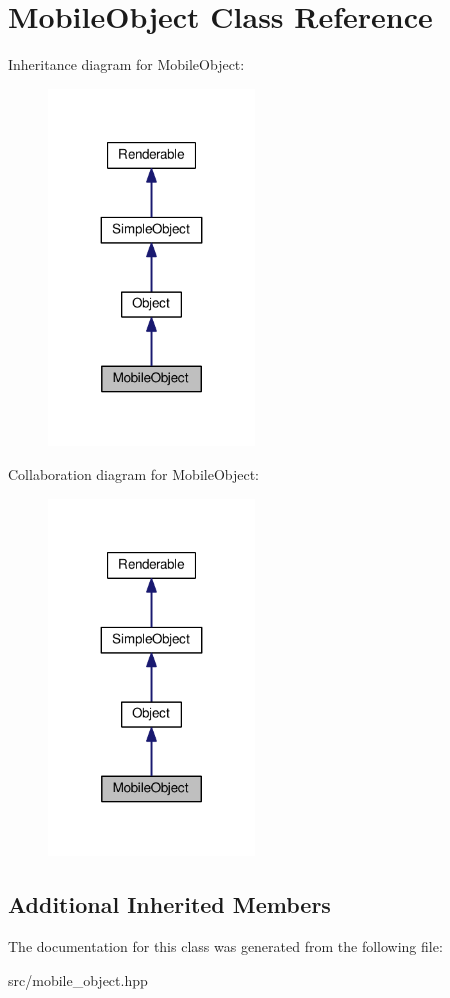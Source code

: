 \hypertarget{class_mobile_object}{}\section{Mobile\+Object Class Reference}
\label{class_mobile_object}


Inheritance diagram for Mobile\+Object\+:\nopagebreak
\begin{figure}[H]
\begin{center}
\leavevmode
\includegraphics[width=155pt]{class_mobile_object__inherit__graph}
\end{center}
\end{figure}


Collaboration diagram for Mobile\+Object\+:\nopagebreak
\begin{figure}[H]
\begin{center}
\leavevmode
\includegraphics[width=155pt]{class_mobile_object__coll__graph}
\end{center}
\end{figure}
\subsection*{Additional Inherited Members}


The documentation for this class was generated from the following file\+:\begin{DoxyCompactItemize}
\item 
src/mobile\+\_\+object.\+hpp\end{DoxyCompactItemize}
